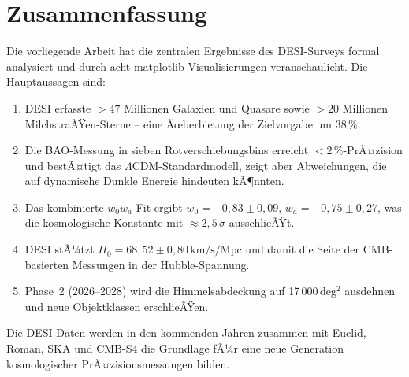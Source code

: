 ﻿\documentclass[a4paper,12pt]{article}
\theoremstyle{definition}
\theoremstyle{remark}
\begin{document}
\section{Zusammenfassung}
\label{sec:zusammenfassung}

Die vorliegende Arbeit hat die zentralen Ergebnisse des DESI-Surveys formal
analysiert und durch acht matplotlib-Visualisierungen veranschaulicht.
Die Hauptaussagen sind:

\begin{enumerate}[label=\arabic*.]
  \item DESI erfasste $>47$ Millionen Galaxien und Quasare sowie $>20$ Millionen
    Milchstra\-ÃŸen-Sterne -- eine Ãœberbietung der Zielvorgabe um 38\,\%.
  \item Die BAO-Messung in sieben Rotverschiebungsbins erreicht $< 2\,\%$-PrÃ¤zision
    und bestÃ¤tigt das $\Lambda$CDM-Standardmodell, zeigt aber Abweichungen,
    die auf dynamische Dunkle Energie hindeuten kÃ¶nnten.
  \item Das kombinierte $w_0 w_a$-Fit ergibt $w_0 = -0{,}83 \pm 0{,}09$,
    $w_a = -0{,}75 \pm 0{,}27$, was die kosmologische Konstante mit
    $\approx 2{,}5\,\sigma$ ausschlieÃŸt.
  \item DESI stÃ¼tzt $H_0 = 68{,}52 \pm 0{,}80\,\mathrm{km/s/Mpc}$ und damit
    die Seite der CMB-basierten Messungen in der Hubble-Spannung.
  \item Phase~2 (2026--2028) wird die Himmelsabdeckung auf 17\,000\,deg$^2$
    ausdehnen und neue Objektklassen erschlieÃŸen.
\end{enumerate}

Die DESI-Daten werden in den kommenden Jahren zusammen mit Euclid, Roman,
SKA und CMB-S4 die Grundlage fÃ¼r eine neue Generation kosmologischer
PrÃ¤zisionsmessungen bilden.
\end{document}
